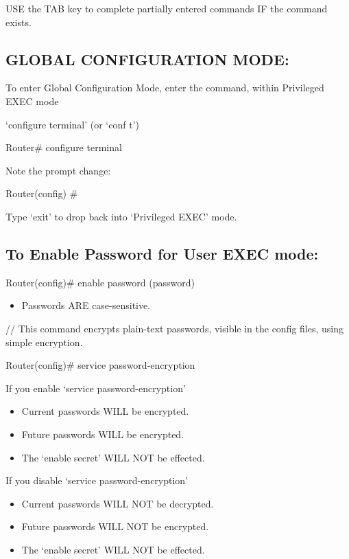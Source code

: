 USE the TAB key to complete partially entered commands IF the command
exists.

\subsection{GLOBAL CONFIGURATION MODE:}\label{global-configuration-mode}

To enter Global Configuration Mode, enter the command, within Privileged
EXEC mode

`configure terminal' (or `conf t')

Router\# configure terminal

Note the prompt change:

Router(config) \#

Type `exit' to drop back into `Privileged EXEC' mode.

\subsection{To Enable Password for User EXEC
mode:}\label{to-enable-password-for-user-exec-mode}

Router(config)\# enable password (password)

\begin{itemize}
\tightlist
\item
  Passwords ARE case-sensitive.
\end{itemize}

// This command encrypts plain-text passwords, visible in the config
files, using simple encryption.

Router(config)\# service password-encryption

If you enable `service password-encryption'

\begin{itemize}
\tightlist
\item
  Current passwords WILL be encrypted.
\item
  Future passwords WILL be encrypted.
\item
  The `enable secret' WILL NOT be effected.
\end{itemize}

If you disable `service password-encryption'

\begin{itemize}
\tightlist
\item
  Current passwords WILL NOT be decrypted.
\item
  Future passwords WILL NOT be encrypted.
\item
  The `enable secret' WILL NOT be effected.
\end{itemize}

